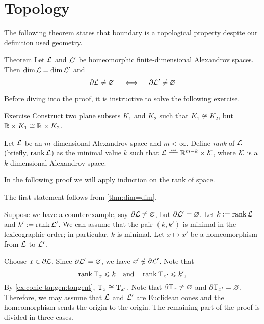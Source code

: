 \section{Topology}

The following theorem states that boundary is a topological property
despite our definition used geometry.

\begin{thm}{Theorem}\label{thm:top-bry}
Let $\mathcal{L}$ and $\mathcal{L}'$ be homeomorphic finite-dimensional Alexandrov spaces.
Then $\operatorname{\rm dim}\nolimits \mathcal{L}=\operatorname{\rm dim}\nolimits\mathcal{L}'$ and
\[\partial\mathcal{L}\ne \varnothing
\quad\iff\quad
\partial\mathcal{L}'\ne \varnothing
\]
\end{thm}


Before diving into the proof, it is instructive to solve the following exercise.

\begin{thm}{Exercise}\label{ex:nonstability}
Construct two plane subsets $K_1$ and $K_2$ such that $K_1\ncong K_2$,
but $\mathbb{R}\times K_1\cong \mathbb{R}\times K_2$.
\end{thm}

Let $\mathcal{L}$ be an $m$-dimensional Alexandrov space and $m<\infty$.
Define \emph{rank} of $\mathcal{L}$ (briefly, $\operatorname{\rm rank}\nolimits\mathcal{L}$) as the minimal value $k$ such that $\spc{L}\iso\RR^{m-k}\times \spc{K}$,
where $\mathcal{K}$ is a $k$-dimensional Alexandrov space.

In the following proof we will apply induction on the rank of space.


The first statement follows from \ref{thm:dim=dim}.

Suppose we have a counterexample, say $\partial \mathcal{L}\ne \varnothing$, but $\partial \mathcal{L}'=\varnothing$.
Let $k\mathrel{:=}\operatorname{\rm rank}\nolimits \mathcal{L}$ and $k'\mathrel{:=}\operatorname{\rm rank}\nolimits \mathcal{L}'$.
We can assume that the pair $(k,k')$ is minimal in the lexicographic order;
in particular, $k$ is minimal.
Let $x\mapsto x'$ be a homeomorphism from $\mathcal{L}$ to $\mathcal{L}'$.

Choose $x\in \partial \mathcal{L}$.
Since $\partial \mathcal{L}'=\varnothing$, we have $x'\notin \partial \mathcal{L}'$.
Note that 
\[\operatorname{\rm rank}\nolimits \mathrm{T}_x\leqslant k
\quad\text{and}\quad
\operatorname{\rm rank}\nolimits \mathrm{T}_{x'}\leqslant k',
\]
By \ref{ex:conic-tangen:tangent}, $\mathrm{T}_x\cong\mathrm{T}_{x'}$.
Note that $\partial \mathrm{T}_x\ne\varnothing$ and $\partial \mathrm{T}_{x'}=\varnothing$.
Therefore, we may assume that $\mathcal{L}$ and $\mathcal{L}'$ are Euclidean cones
and the homeomorphism sends the origin to the origin.
The remaining part of the proof is divided in three cases.


